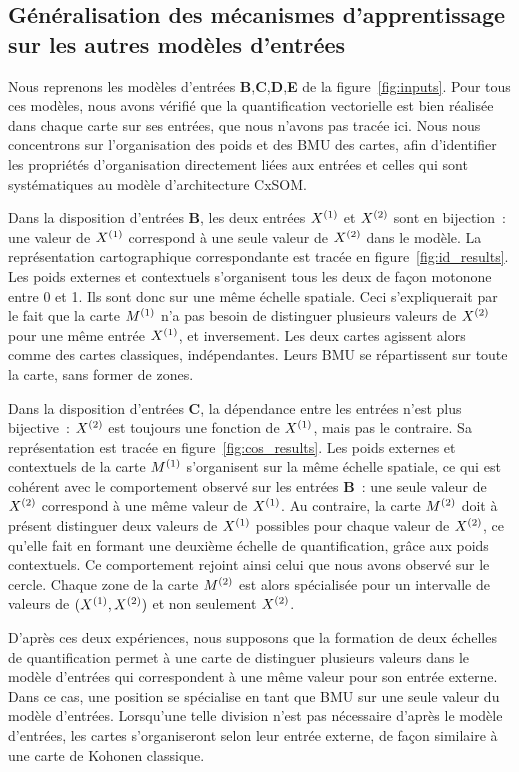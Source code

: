 \documentclass[../main]{subfiles}
\begin{document}
\subsection{Généralisation des mécanismes d'apprentissage sur les autres modèles d'entrées}

Nous reprenons les modèles d'entrées \textbf{B},\textbf{C},\textbf{D},\textbf{E} de la figure~\ref{fig:inputs}.
Pour tous ces modèles, nous avons vérifié que la quantification vectorielle est bien réalisée dans chaque carte sur ses entrées, que nous n'avons pas tracée ici.
Nous nous concentrons sur l'organisation des poids et des BMU des cartes, afin d'identifier les propriétés d'organisation directement liées aux entrées et celles qui sont systématiques au modèle d'architecture CxSOM.

Dans la disposition d'entrées \textbf{B}, les deux entrées $X^{({1})}$ et $X^{({2})}$ sont en bijection~: une valeur de $X^{({1})}$ correspond à une seule valeur de $X^{({2})}$ dans le modèle.
La représentation cartographique correspondante est tracée en figure~\ref{fig:id_results}.
Les poids externes et contextuels s'organisent tous les deux de façon motonone entre 0 et 1. Ils sont donc sur une même échelle spatiale. Ceci s'expliquerait par le fait que la carte $M^{({1})}$ n'a pas besoin de distinguer plusieurs valeurs de $X^{({2})}$ pour une même entrée $X^{({1})}$, et inversement. Les deux cartes agissent alors comme des cartes classiques, indépendantes. Leurs BMU se répartissent sur toute la carte, sans former de zones.


Dans la disposition d'entrées \textbf{C}, la dépendance entre les entrées n'est plus bijective~: $X^{({2})}$ est toujours une fonction de $X^{({1})}$, mais pas le contraire. Sa représentation est tracée en figure~\ref{fig:cos_results}.
Les poids externes et contextuels de la carte $M^{({1})}$ s'organisent sur la même échelle spatiale, ce qui est cohérent avec le comportement observé sur les entrées \textbf{B}~: une seule valeur de $X^{({2})}$ correspond à une même valeur de $X^{({1})}$.
Au contraire, la carte $M^{({2})}$ doit à présent distinguer deux valeurs de $X^{({1})}$ possibles pour chaque valeur de $X^{({2})}$, ce qu'elle fait en formant une deuxième échelle de quantification, grâce aux poids contextuels. Ce comportement rejoint ainsi celui que nous avons observé sur le cercle. Chaque zone de la carte $M^{({2})}$ est alors spécialisée pour un intervalle de valeurs de $(X^{({1})}, X^{({2})})$ et non seulement $X^{({2})}$.

D'après ces deux expériences, nous supposons que la formation de deux échelles de quantification permet à une carte de distinguer plusieurs valeurs dans le modèle d'entrées qui correspondent à une même valeur pour son entrée externe. Dans ce cas, une position se spécialise en tant que BMU sur une seule valeur du modèle d'entrées.
Lorsqu'une telle division n'est pas nécessaire d'après le modèle d'entrées, les cartes s'organiseront selon leur entrée externe, de façon similaire à une carte de Kohonen classique.
\end{document}

